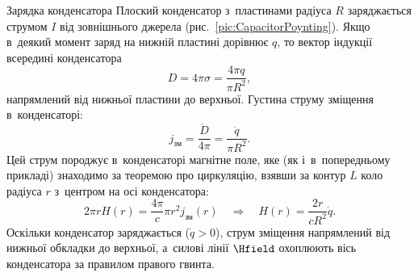 \begin{Example}{Зарядка конденсатора}
	Плоский конденсатор з~пластинами радіуса $R$ заряджається струмом $I$ від зовнішнього
	джерела (рис.~\ref{pic:CapacitorPoynting}). Якщо в~деякий момент заряд на нижній
	пластині дорівнює $q$, то вектор індукції всередині конденсатора
	\begin{equation}\label{eq:CapacitorD}
		D = 4\pi\sigma = \frac{4\pi q}{\pi R^2},
	\end{equation}
	напрямлений від нижньої пластини до верхньої. Густина струму зміщення в~конденсаторі:
	\begin{equation*}
		j_\text{зм} = \frac{\dot D}{4\pi} = \frac{\dot q}{\pi R^2}.
	\end{equation*}
	Цей струм породжує в~конденсаторі магнітне поле, яке (як і~в~попередньому прикладі)
	знаходимо за теоремою про циркуляцію, взявши за контур $L$ коло радіуса $r$ з~центром
	на осі конденсатора:
	\begin{equation*}
		2\pi r H(r) = \frac{4\pi}{c}\pi r^2 j_\text{зм}(r) \quad\Rightarrow\quad H(r) = \frac{2r}{cR^2}\dot q.
	\end{equation*}
	Оскільки конденсатор заряджається ($\dot q>0$), струм зміщення напрямлений від нижньої обкладки до верхньої, а~силові лінії $\Hfield$ охоплюють вісь конденсатора за правилом правого гвинта.


\end{Example}
